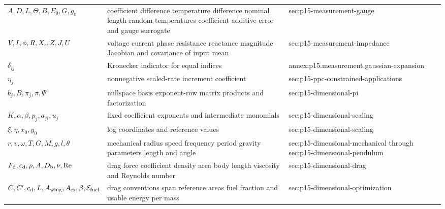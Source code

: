 \begin{longtable}{@{}p{}p{}p{}@{}}
\(A,\allowbreak D,\allowbreak L,\allowbreak \Theta,\allowbreak B,\allowbreak E_0,\allowbreak G,\allowbreak g_0\) & coefficient difference temperature difference nominal length random temperatures coefficient additive error and gauge surrogate & sec:\allowbreak{}p15-\allowbreak{}measurement-\allowbreak{}gauge \\
\(V,\allowbreak I,\allowbreak \phi,\allowbreak R,\allowbreak X_{\rm r},\allowbreak Z,\allowbreak J,\allowbreak U\) & voltage current phase resistance reactance magnitude Jacobian and covariance of input mean & sec:\allowbreak{}p15-\allowbreak{}measurement-\allowbreak{}impedance \\
\(\delta_{ij}\) & Kronecker indicator for equal indices & annex:\allowbreak{}p15.\allowbreak{}measurement.\allowbreak{}gaussian-\allowbreak{}expansion \\
\(\eta_j\) & nonnegative scaled-rate increment coefficient & sec:\allowbreak{}p15-\allowbreak{}ppc-\allowbreak{}constrained-\allowbreak{}applications \\
\(b_j,\allowbreak B,\allowbreak \pi_j,\allowbreak \pi,\allowbreak \Psi\) & nullspace basis exponent-row matrix products and factorization & sec:\allowbreak{}p15-\allowbreak{}dimensional-\allowbreak{}pi \\
\(K,\allowbreak \alpha,\allowbreak \beta,\allowbreak p_j,\allowbreak a_{ji},\allowbreak u_j\) & fixed coefficient exponents and intermediate monomials & sec:\allowbreak{}p15-\allowbreak{}dimensional-\allowbreak{}scaling \\
\(\xi,\allowbreak \eta,\allowbreak x_0,\allowbreak y_0\) & log coordinates and reference values & sec:\allowbreak{}p15-\allowbreak{}dimensional-\allowbreak{}scaling \\
\(r,\allowbreak v,\allowbreak \omega,\allowbreak T,\allowbreak G,\allowbreak M,\allowbreak g,\allowbreak l,\allowbreak \theta\) & mechanical radius speed frequency period gravity parameters length and angle & sec:\allowbreak{}p15-\allowbreak{}dimensional-\allowbreak{}mechanical through sec:\allowbreak{}p15-\allowbreak{}dimensional-\allowbreak{}pendulum \\
\(F_{\rm d},\allowbreak c_{\rm d},\allowbreak \rho,\allowbreak A,\allowbreak D_{\rm b},\allowbreak \nu,\allowbreak \mathrm{Re}\) & drag force coefficient density area body length viscosity and Reynolds number & sec:\allowbreak{}p15-\allowbreak{}dimensional-\allowbreak{}drag \\
\(C,\allowbreak C',\allowbreak c_{\rm d},\allowbreak L,\allowbreak A_{\rm wing},\allowbreak A_{\rm cs},\allowbreak \beta,\allowbreak \mathcal E_{\rm fuel}\) & drag conventions span reference areas fuel fraction and usable energy per mass & sec:\allowbreak{}p15-\allowbreak{}dimensional-\allowbreak{}optimization \\

\end{longtable}
